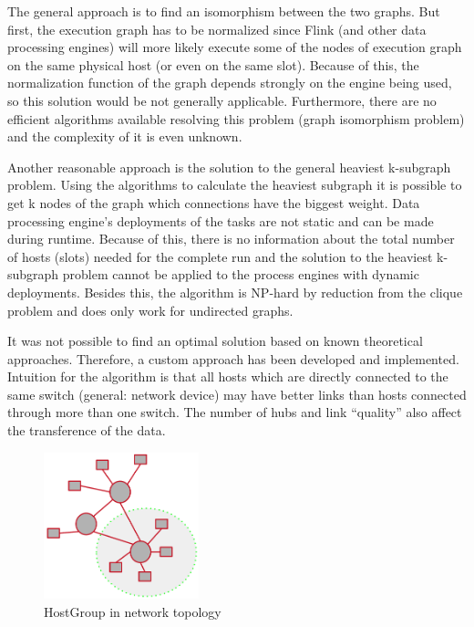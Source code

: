 The general approach is to find an isomorphism between the two graphs. But first, the execution
graph has to be normalized since Flink (and other data processing engines) will more likely execute
some of the nodes of execution graph on the same physical host (or even on the same slot). Because
of this, the normalization function of the graph depends strongly on the engine being used, so this
solution would be not generally applicable. Furthermore, there are no efficient algorithms available
resolving this problem (graph isomorphism problem) and the complexity of it is even unknown.
\cite{graph}

Another reasonable approach is the solution to the general heaviest k-subgraph problem. Using the
algorithms to calculate the heaviest subgraph it is possible to get k nodes of the graph which
connections have the biggest weight. Data processing engine's deployments of the tasks are not
static and can be made during runtime. Because of this, there is no information about the total
number of hosts (slots) needed for the complete run and the solution to the heaviest k-subgraph
problem cannot be applied to the process engines with dynamic deployments. Besides this, the
algorithm is NP­-hard by reduction from the clique problem and does only work for undirected graphs.
\cite{ksubgraph}

It was not possible to find an optimal solution based on known theoretical approaches. Therefore, a
custom approach has been developed and implemented. Intuition for the algorithm is that
all hosts which are directly connected to the same switch (general: network device) may have better
links than hosts connected through more than one switch. The number of hubs and link “quality” also
affect the transference of the data.

\begin{figure}[h]
    \centering
    \includegraphics[width=0.4\textwidth]{graphics/hostgroup.png}
    \caption{HostGroup in network topology}
    \label{fig:hostgroup}
\end{figure}

